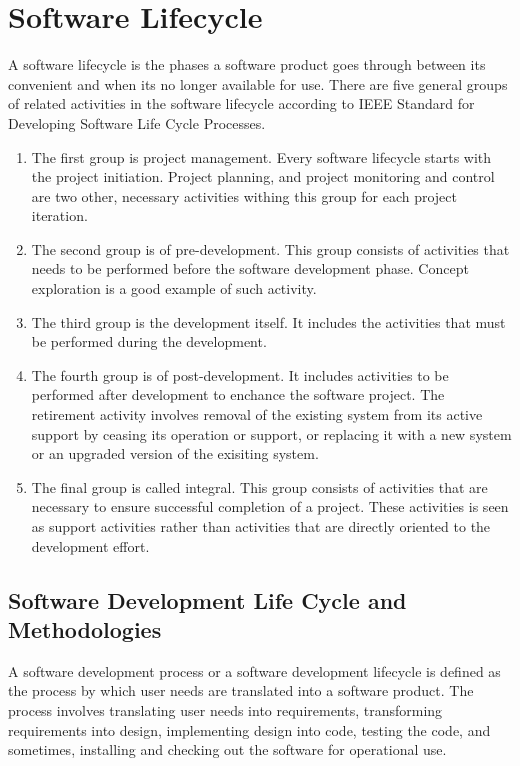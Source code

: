 


\section{Software Lifecycle}
A software lifecycle is the phases a software product goes through between its convenient and when its no longer available for use\cite{159431}. There are five general groups of related activities in the software lifecycle according to IEEE Standard for Developing Software Life Cycle Processes\cite{159431}. 

\begin{enumerate}
	\item The first group is project management. Every software lifecycle starts with the project initiation. Project planning, and project monitoring and control are two other, necessary activities withing this group for each project iteration. 
	\item The second group is of pre-development. This group consists of activities that needs to be performed before the software development phase. Concept exploration is a good example of such activity. 
	\item The third group is the development itself. It includes the activities that must be performed during the development.
	\item The fourth group is of post-development. It includes activities to be performed after development to enchance the software project. The retirement activity involves removal of the existing system from its active support by ceasing its operation or support, or replacing it with a new system or an upgraded version of the exisiting system. 
	\item The final group is called integral. This group consists of activities that are necessary to ensure successful completion of a project. These activities is seen as support activities rather than activities that are directly oriented to the development effort.
\end{enumerate}

\subsection{Software Development Life Cycle and Methodologies} %
A software development process or a software development lifecycle is defined as the process by which user needs are translated into a software product\cite{radatz1990ieee}. The process involves translating user needs into requirements, transforming requirements into design, implementing design into code, testing the code, and sometimes, installing and checking out the software for operational use.

